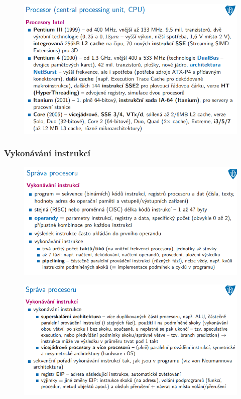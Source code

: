 \documentclass[10pt,a4paper]{article}
\begin{document}
\begin{figure} [h]
	\includegraphics[scale=0.65]{img/prvni_odstavec/otazka5/procesor9.png}	
\end{figure}

\clearpage
\subsubsection{Vykonávání instrukcí}
\begin{figure} [h]
	\includegraphics[scale=0.65]{img/prvni_odstavec/otazka5/vykonavani_instrukci1.png}	
\end{figure}

\begin{figure} [h]
	\includegraphics[scale=0.65]{img/prvni_odstavec/otazka5/vykonavani_instrukci2.png}	
\end{figure}
\end{document}
